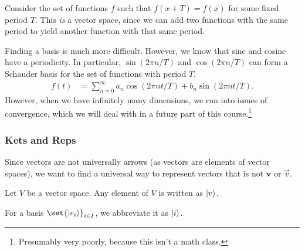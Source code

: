 \documentclass[10pt]{mypackage}
\begin{document}
\begin{example}
Consider the set of functions $f$ such that $f(x + T) = f(x)$ for some fixed period $T$. This \textit{is} a vector space, since we can add two functions with the same period to yield another function with that same period.\newline

Finding a basis is much more difficult. However, we know that sine and cosine have a periodicity. In particular, $\sin(2\pi n/T)$ and $\cos(2\pi n/T)$ can form a Schauder basis for the set of functions with period $T$.
\begin{align*}
  f(t) &= \sum_{n=0}^{\infty} a_n\cos(2\pi nt/T) + b_n\sin(2\pi nt/T).
\end{align*}
However, when we have infinitely many dimensions, we run into issues of convergence, which we will deal with in a future part of this course.\footnote{Presumably very poorly, because this isn't a math class.}
\end{example}
\subsubsection{Kets and Reps}%
Since vectors are not universally arrows (as vectors are elements of vector spaces), we want to find a universal way to represent vectors that is not $\mathbf{v}$ or $\vec{v}$.
\begin{definition}[Ket]
  Let $V$ be a vector space. Any element of $V$ is written as $\ket{v}$.
\end{definition}
For a basis $\set{\ket{e_i}}_{i\in I}$, we abbreviate it as $\ket{i}$.\newline
\end{document}
